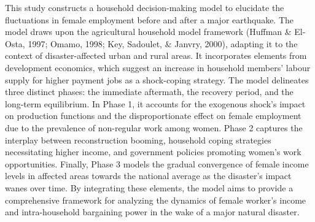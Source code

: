 \documentclass[a4paper,12pt]{article}
\begin{document}
This study constructs a household decision-making model to elucidate the fluctuations in female employment before and after a major earthquake. The model draws upon the agricultural household model framework (Huffman \& El-Osta, 1997; Omamo, 1998; Key, Sadoulet, \& Janvry, 2000), adapting it to the context of disaster-affected urban and rural areas. It incorporates elements from development economics, which suggest an increase in household members' labour supply for higher payment jobs as a shock-coping strategy.
The model delineates three distinct phases: the immediate aftermath, the recovery period, and the long-term equilibrium. In Phase 1, it accounts for the exogenous shock's impact on production functions and the disproportionate effect on female employment due to the prevalence of non-regular work among women. Phase 2 captures the interplay between reconstruction booming, household coping strategies necessitating higher income, and government policies promoting women's work opportunities. Finally, Phase 3 models the gradual convergence of female income levels in affected areas towards the national average as the disaster's impact wanes over time.
By integrating these elements, the model aims to provide a comprehensive framework for analyzing the dynamics of female worker's income and intra-household bargaining power in the wake of a major natural disaster.


\nocite{*}

\end{document}
